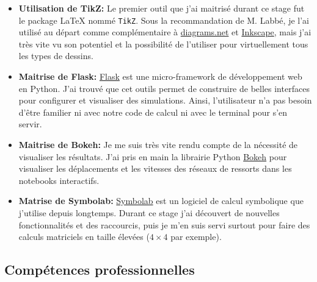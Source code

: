 \begin{itemize}
   \item \textbf{Utilisation de TikZ:} Le premier outil que j'ai maitrisé durant ce stage fut le package LaTeX nommé \texttt{TikZ}. Sous la recommandation de M. Labbé, je l'ai utilisé au départ comme complémentaire à \href{https://www.diagrams.net/}{diagrams.net} et \href{https://inkscape.org/about/}{Inkscape}, mais j'ai très vite vu son potentiel et la possibilité de l'utiliser pour virtuellement tous les types de dessins.
   \item \textbf{Maitrise de Flask:} \href{https://flask.palletsprojects.com/en/2.0.x/}{Flask} est une micro-framework de développement web en Python. J'ai trouvé que cet outils permet de construire de belles interfaces pour configurer et visualiser des simulations. Ainsi, l'utilisateur n'a pas besoin d'être familier ni avec notre code de calcul ni avec le terminal pour s'en servir. 
   \item \textbf{Maitrise de Bokeh:} Je me suis très vite rendu compte de la nécessité de visualiser les résultats. J'ai pris en main la librairie Python \href{https://bokeh.org/}{Bokeh} pour visualiser les déplacements et les vitesses des réseaux de ressorts dans les notebooks interactifs. 
   \item \textbf{Matrise de Symbolab:} \href{https://www.symbolab.com/}{Symbolab} est un logiciel de calcul symbolique que j'utilise depuis longtemps. Durant ce stage j'ai découvert de nouvelles fonctionnalités et des raccourcis, puis je m'en suis servi surtout pour faire des calculs matriciels en taille élevées ($4\times 4$ par exemple). 
\end{itemize}





\subsection{Compétences professionnelles}


